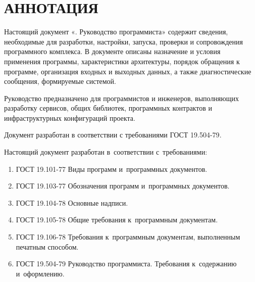 \documentclass[12pt,a4paper]{extarticle}
\begin{document}
\sloppy



\section*{АННОТАЦИЯ}

Настоящий документ «\hseProjectName. Руководство программиста» содержит сведения, необходимые для разработки, настройки, запуска, проверки и сопровождения программного комплекса. В документе описаны назначение и условия применения программы, характеристики архитектуры, порядок обращения к программе, организация входных и выходных данных, а также диагностические сообщения, формируемые системой.

Руководство предназначено для программистов и инженеров, выполняющих разработку сервисов, общих библиотек, программных контрактов и инфраструктурных конфигураций проекта.

Документ разработан в соответствии с требованиями ГОСТ 19.504-79\cite{gost19504}.

\clearpage

\noindent
Настоящий документ разработан в~соответствии с~требованиями:

\begin{enumerate}[label=\arabic*), leftmargin=1.25cm]
  \item ГОСТ 19.101-77 Виды программ и~программных документов\cite{gost19101}.
  \item ГОСТ 19.103-77 Обозначения программ и~программных документов\cite{gost19103}.
  \item ГОСТ 19.104-78 Основные надписи\cite{gost19104}.
  \item ГОСТ 19.105-78 Общие требования к~программным документам\cite{gost19105}.
  \item ГОСТ 19.106-78 Требования к~программным документам, выполненным
        печатным способом\cite{gost19106}.
  \item ГОСТ 19.504-79 Руководство программиста. Требования
        к~содержанию и~оформлению\cite{gost19504}.
\end{enumerate}
\end{document}
